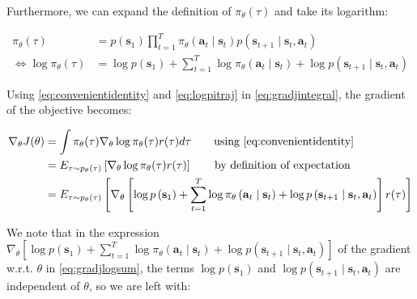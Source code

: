 \documentclass{article}
\begin{document}
Furthermore, we can expand the definition of $\pi_\theta\left(\tau\right)$ and take its logarithm:

\begin{subequations}
  \begin{align}
    \pi_\theta\left(\tau\right)
      &= p\left(\mathbf{s}_1\right)\prod_{t=1}^T\pi_\theta\left(\mathbf{a}_t\mid \mathbf{s}_t\right)p\left(\mathbf{s}_{t+1} \mid \mathbf{s}_t ,\mathbf{a}_t\right)\\
    \Leftrightarrow \log\pi_\theta\left(\tau\right)
      &= \log p\left(\mathbf{s}_1\right) + \sum_{t=1}^T\log\pi_\theta\left(\mathbf{a}_t\mid \mathbf{s}_t\right)+ \log p\left(\mathbf{s}_{t+1} \mid \mathbf{s}_t ,\mathbf{a}_t\right) \label{eq:logpitraj}
  \end{align}
\end{subequations}

Using \eqref{eq:convenientidentity} and \eqref{eq:logpitraj} in \eqref{eq:gradjintegral}, the gradient of the objective becomes:

\begin{subequations}
  \begin{align}
    \nabla_\theta J(\theta) 
      &= \int\pi_\theta(\tau)\nabla_\theta\log\pi_\theta(\tau) r(\tau)d\tau \qquad\text{using \eqref{eq:convenientidentity}}\\
      &= E_{\tau\sim p_\theta(\tau)}\left[\nabla_\theta\log\pi_\theta(\tau) r(\tau)\right]\qquad\text{by definition of expectation}\\
      &= E_{\tau\sim p_\theta(\tau)}\left[\nabla_\theta \left[\log p\left(\mathbf{s}_1\right) + \sum_{t=1}^T\log\pi_\theta\left(\mathbf{a}_t\mid \mathbf{s}_t\right)+ \log p\left(\mathbf{s}_{t+1} \mid \mathbf{s}_t ,\mathbf{a}_t\right)\right] r(\tau)\right] \label{eq:gradjlogsum}
  \end{align}
\end{subequations}

We note that in the expression $\nabla_\theta \left[\log p\left(\mathbf{s}_1\right) + \sum_{t=1}^T\log\pi_\theta\left(\mathbf{a}_t\mid \mathbf{s}_t\right)+ \log p\left(\mathbf{s}_{t+1} \mid \mathbf{s}_t ,\mathbf{a}_t\right)\right]$ of the gradient w.r.t. $\theta$ in \eqref{eq:gradjlogsum}, the terms $\log p\left(\mathbf{s}_1\right)$ and $\log p\left(\mathbf{s}_{t+1} \mid \mathbf{s}_t ,\mathbf{a}_t\right)$ are independent of $\theta$, so we are left with:
\end{document}
